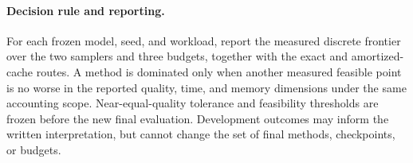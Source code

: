 \paragraph{Decision rule and reporting.}
For each frozen model, seed, and workload, report the measured discrete frontier over the two samplers and three budgets, together with the exact and amortized-cache routes. A method is dominated only when another measured feasible point is no worse in the reported quality, time, and memory dimensions under the same accounting scope. Near-equal-quality tolerance and feasibility thresholds are frozen before the new final evaluation. Development outcomes may inform the written interpretation, but cannot change the set of final methods, checkpoints, or budgets.

